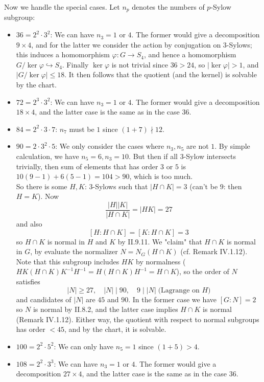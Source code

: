 \begin{pf}
Now we handle the special cases. Let $n_p$ denotes the numbers of $p$-Sylow subgroup:
\begin{itemize}
\setlength\itemsep{0pt}
\item $36 = 2^2 \cdot 3^2$: We can have $n_3 = 1$ or $4$. The former would give a decomposition $9 \times 4$, and for the latter we consider the action by conjugation on $3$-Sylows; this induces a homomorphism $\varphi : G \to S_4$, and hence a homomorphism $G/\ker \varphi \hookrightarrow S_4$. Finally $\ker \varphi$ is not trivial since $36 > 24$, so $|\ker \varphi|>1$, and $|G/\ker \varphi| \leq 18$. It then follows that the quotient (and the kernel) is solvable by the chart. 
\item $72 = 2^3 \cdot 3^2$: We can have $n_3 = 1$ or $4$. The former would give a decomposition $18 \times 4$, and the latter case is the same as in the case $36$.
\item $84 = 2^2 \cdot 3 \cdot 7$: $n_7$ must be $1$ since $(1+7) \nmid 12$. 
\item $90 = 2 \cdot 3^2 \cdot 5$: We only consider the cases where $n_3, n_5$ are not $1$. By simple calculation, we have $n_5 = 6, n_3 = 10$. But then if all $3$-Sylow intersects trivially, then sum of elements that has order $3$ or $5$ is $10(9-1)+6(5-1) = 104 > 90$, which is too much. \\
So there is some $H,K$: $3$-Sylows such that $|H \cap K| = 3$ (can't be $9$: then $H = K$). Now
\[
\frac{|H||K|}{|H \cap K|} = |HK| = 27	
\]
and also 
\[
[H:H\cap K] = [K:H\cap K] = 3
\]
so $H\cap K$ is normal in $H$ and $K$ by II.9.11. We "claim" that $H \cap K$ is normal in $G$, by evaluate the normalizer $N = N_G(H \cap K)$ (cf. Remark IV.1.12). Note that this subgroup includes $HK$ by normalness ($HK(H \cap K)K^{-1}H^{-1} = H(H \cap K)H^{-1} = H \cap K$), so the order of $N$ satisfies
\[
|N| \geq 27, \quad |N| \mid 90, \quad 9 \mid |N| \; \text{(Lagrange on }H)
\]
and candidates of $|N|$ are $45$ and $90$. In the former case we have $[G : N] = 2$ so $N$ is normal by II.8.2, and the latter case implies $H \cap K$ is normal (Remark IV.1.12). Either way, the quotient with respect to normal subgroups has order $<45$, and by the chart, it is solvable.
\item $100 = 2^2 \cdot 5^2$: We can only have $n_5 = 1$ since $(1+5) > 4$. 
\item $108 = 2^2 \cdot 3^3$: We can have $n_3 = 1$ or $4$. The former would give a decomposition $27 \times 4$, and the latter case is the same as in the case $36$.
\end{itemize}


\end{pf}
